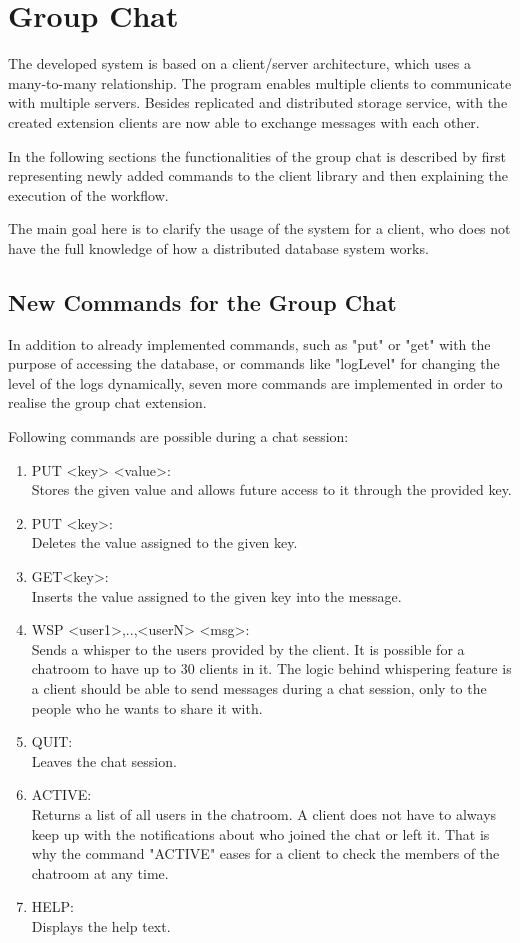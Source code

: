 \section{Group Chat}
\label{sec:groupchat}

The developed system is based on a client/server architecture, which uses a many-to-many relationship. The program enables multiple clients to communicate with multiple servers. Besides replicated and distributed storage service, with the created extension clients are now able to exchange messages with each other.

In the following sections the functionalities of the group chat is described by first representing newly added commands to the client library and then explaining the execution of the workflow.

The main goal here is to clarify the usage of the system for a client, who does not have the full knowledge of how a distributed database system works.

\subsection{New Commands for the Group Chat}
\label{sec:groupchat_commands}

In addition to already implemented commands, such as "put" or "get" with the purpose of accessing the database, or commands like "logLevel" for changing the level of the logs dynamically, seven more commands are implemented in order to realise the group chat extension.

Following commands are possible during a chat session:
\begin{enumerate}
  \item 	PUT <key> <value>: \\
Stores the given value and allows future access to it through the provided key. 
  \item PUT <key>:\\
Deletes the value assigned to the given key.
  \item GET{<key>}:\\
Inserts the value assigned to the given key into the message.
  \item WSP <user1>,..,<userN> <msg>:\\
Sends a whisper to the users provided by the client. It is possible for a chatroom to have up to 30 clients in it. The logic behind whispering feature is a client should be able to send messages during a chat session, only to the people who he wants to share it with.  
  \item QUIT:\\
  Leaves the chat session.
  \item ACTIVE:\\
   Returns a list of all users in the chatroom. A client does not have to always keep up with the notifications about who joined the chat or left it. That is why the command "ACTIVE" eases for a client to check the members of the chatroom at any time.
  \item HELP:\\
  Displays the help text.
\end{enumerate}

